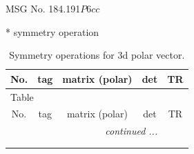 \documentclass[fleqn,8pt]{jsarticle}
\begin{document}
\setcounter{MaxMatrixCols}{32}

\renewcommand{\tablename}{Table~}
\renewcommand{\figurename}{Figure~}
\begin{center}
\LARGE
MSG No. 184.191\quad$P6cc$
\end{center}
* symmetry operation
\renewcommand{\arraystretch}{1.3}
\begin{longtable}{ccccc}
\caption{Symmetry operations for 3d polar vector.}
 \\
 \hline \hline
No. & tag & matrix (polar) & det & TR \\ \hline \endfirsthead

\multicolumn{4}{l}{\tablename\ \thetable{}} \\
 \hline \hline
No. & tag & matrix (polar) & det & TR \\ \hline \endhead

 \hline \hline
\multicolumn{4}{r}{\footnotesize\it continued ...} \\ \endfoot

 \hline \hline
\multicolumn{4}{r}{} \\ \endlastfoot


\end{longtable}
\end{document}
